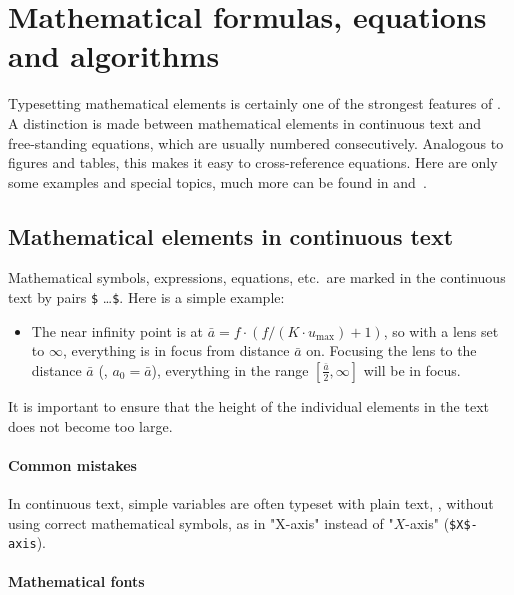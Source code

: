 \chapter[Mathematical formulas \etc]{Mathematical formulas, equations and algorithms}
\label{cha:Mathematics}


Typesetting mathematical elements is certainly one of the strongest features of
\latex. A distinction is made between mathematical elements in continuous text
and free-standing equations, which are usually numbered consecutively.
Analogous to figures and tables, this makes it easy to cross-reference equations.
Here are only some examples and special topics, much more can be found in 
\cite[Ch.\ 7]{Kopka2003} and~\cite{Voss2014}.


\section{Mathematical elements in continuous text}

Mathematical symbols, expressions, equations, etc.\ are marked in the continuous
text by pairs \verb!$! \ldots \verb!$!. Here is a simple example:
%
\begin{itemize}
	\item[]
	The near infinity point is at $\bar{a} = f \cdot (f / (K \cdot u_{\max}) + 1)$, 
	so with a lens set to $\infty$, everything is in focus from distance $\bar{a}$ on.
	Focusing the lens to the distance $\bar{a}$ (\ie, $a_0 = \bar{a}$), everything
	in the range $[\frac{\bar{a}}{2}, \infty]$ will be in focus.
\end{itemize}
%
It is important to ensure that the height of the individual elements in the text
does not become too large.

\subsubsection{Common mistakes}

In continuous text, simple variables are often typeset with plain text,
\ie, without using correct mathematical symbols, as in "X-axis" instead of 
"$X$-axis" (\verb!$X$-axis!).


\subsubsection{Mathematical fonts}

